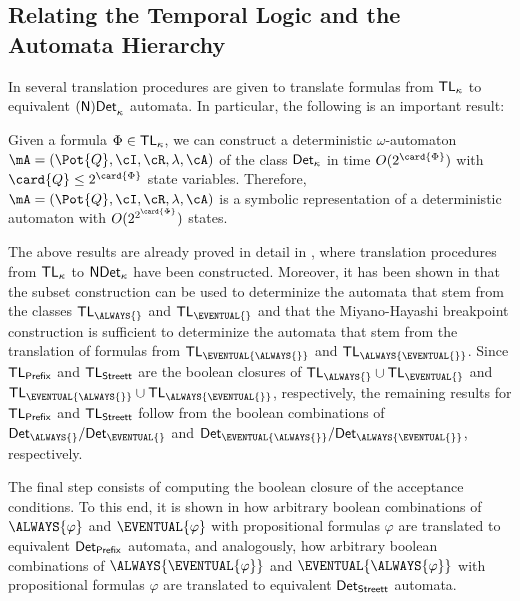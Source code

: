 \documentclass[submission,copyright,creativecommons]{eptcs}
\begin{document}
\subsection{Relating the Temporal Logic and the Automata Hierarchy}

In \cite{Schn01b,Schn03} several translation procedures are given to translate formulas from ${\sf TL}_{\kappa}$ to equivalent ${\sf (N)Det}_\kappa$ automata. In particular, the following is an important result:

\begin{theorem} \label{borel_thm}
Given a formula $\Phi \in {\sf TL}_\kappa$, we can construct a deterministic $\omega$-automaton $\mA=(\Pot{Q},\cI,\cR,\lambda,\cA)$ of the class ${\sf Det}_\kappa$ in time $O(2^{\card{\Phi}})$ with $\card{Q}\leq 2^{\card{\Phi}}$ state variables. Therefore, $\mA=(\Pot{Q},\cI,\cR,\lambda,\cA)$ is a symbolic representation of a deterministic automaton with $O(2^{2^{\card{\Phi}}})$ states.
\end{theorem}

\noindent The above results are already proved in detail in \cite{Schn03}, where translation procedures from ${\sf TL}_\kappa$ to ${\sf NDet}_\kappa$ have been constructed. Moreover, it has been shown in \cite{Schn03} that the subset construction can be used to determinize the automata that stem from the classes ${\sf TL}_{\ALWAYS{}}$ and ${\sf TL}_{\EVENTUAL{}}$ and that the Miyano-Hayashi breakpoint construction is sufficient to determinize the automata that stem from the translation of formulas from ${\sf TL}_{\EVENTUAL{\ALWAYS{}}}$ and ${\sf TL}_{\ALWAYS{\EVENTUAL{}}}$. Since ${\sf TL}_{\sf Prefix}$ and ${\sf TL}_{\sf Streett}$ are the boolean closures of ${\sf TL}_{\ALWAYS{}}\cup{\sf TL}_{\EVENTUAL{}}$ and ${\sf TL}_{\EVENTUAL{\ALWAYS{}}}\cup{\sf TL}_{\ALWAYS{\EVENTUAL{}}}$, respectively, the remaining results for ${\sf TL}_{\sf Prefix}$ and ${\sf TL}_{\sf Streett}$ follow from the boolean combinations of ${\sf Det}_{\ALWAYS{}}/{\sf Det}_{\EVENTUAL{}}$ and ${\sf Det}_{\EVENTUAL{\ALWAYS{}}}/{\sf Det}_{\ALWAYS{\EVENTUAL{}}}$, respectively. 

The final step consists of computing the boolean closure of the acceptance conditions. To this end, it is shown in \cite{Schn03} how arbitrary boolean combinations of $\ALWAYS{\varphi}$ and $\EVENTUAL{\varphi}$ with propositional formulas $\varphi$ are translated to equivalent ${\sf Det}_{\sf Prefix}$ automata, and analogously, how arbitrary boolean combinations of $\ALWAYS{\EVENTUAL{\varphi}}$ and $\EVENTUAL{\ALWAYS{\varphi}}$ with propositional formulas $\varphi$ are translated to equivalent ${\sf Det}_{\sf Streett}$ automata.
\end{document}
